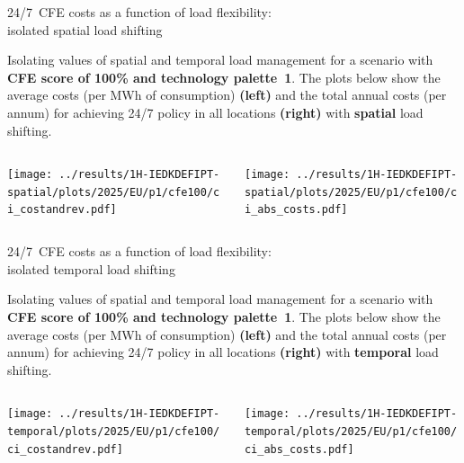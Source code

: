\begin{frame}{24/7~CFE costs as a function of load flexibility:\\
  isolated spatial load shifting}
  \label{isolated_spatial_cfe100_p1}

  {\footnotesize
  
  Isolating values of spatial and temporal load management for a scenario with {\bf CFE score of 100\% and technology palette~1}. 
  The plots below show the average costs (per MWh of consumption) {\bf (left)} and the total annual costs (per annum) for achieving 24/7 policy in all locations {\bf (right)} with {\bf spatial} load shifting.

  \begin{columns}[T]
  \begin{column}{8cm}
  \centering
  \texttt{[image: ../results/1H-IEDKDEFIPT-spatial/plots/2025/EU/p1/cfe100/ci\_costandrev.pdf]}
  \end{column}

  \begin{column}{7cm}
    \texttt{[image: ../results/1H-IEDKDEFIPT-spatial/plots/2025/EU/p1/cfe100/ci\_abs\_costs.pdf]}
  \end{column}
  \end{columns}
  }
\end{frame}


\begin{frame}{24/7~CFE costs as a function of load flexibility:\\
  isolated temporal load shifting}
  \label{isolated_temporal_cfe100_p1}

  {\footnotesize
  
  Isolating values of spatial and temporal load management for a scenario with {\bf CFE score of 100\% and technology palette~1}. 
  The plots below show the average costs (per MWh of consumption) {\bf (left)} and the total annual costs (per annum) for achieving 24/7 policy in all locations {\bf (right)} with {\bf temporal} load shifting.

  \begin{columns}[T]
  \begin{column}{8cm}
  \centering
  \texttt{[image: ../results/1H-IEDKDEFIPT-temporal/plots/2025/EU/p1/cfe100/ci\_costandrev.pdf]}
  \end{column}

  \begin{column}{7cm}
    \texttt{[image: ../results/1H-IEDKDEFIPT-temporal/plots/2025/EU/p1/cfe100/ci\_abs\_costs.pdf]}
  \end{column}
  \end{columns}
  }
\end{frame}


